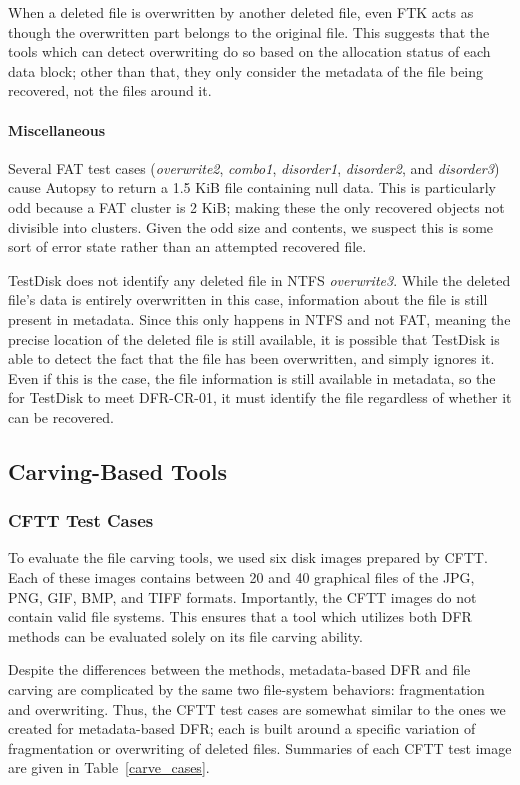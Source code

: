 When a deleted file is overwritten by another deleted file, even FTK acts as though the overwritten part belongs to the original file.
This suggests that the tools which can detect overwriting do so based on the allocation status of each data block; other than that, they only consider the metadata of the file being recovered, not the files around it.

\paragraph{Miscellaneous}
Several FAT test cases (\emph{overwrite2}, \emph{combo1}, \emph{disorder1}, \emph{disorder2}, and \emph{disorder3}) cause Autopsy to return a 1.5 KiB file containing null data.
This is particularly odd because a FAT cluster is 2 KiB; making these the only recovered objects not divisible into clusters.
Given the odd size and contents, we suspect this is some sort of error state rather than an attempted recovered file.

TestDisk does not identify any deleted file in NTFS \emph{overwrite3}.
While the deleted file's data is entirely overwritten in this case, information about the file is still present in metadata.
Since this only happens in NTFS and not FAT, meaning the precise location of the deleted file is still available, it is possible that TestDisk is able to detect the fact that the file has been overwritten, and simply ignores it.
Even if this is the case, the file information is still available in metadata, so the for TestDisk to meet DFR-CR-01, it must identify the file regardless of whether it can be recovered.


\subsection{Carving-Based Tools}

\subsubsection{CFTT Test Cases}
To evaluate the file carving tools, we used six disk images prepared by CFTT\cite{cftt_carving_images}.
Each of these images contains between 20 and 40 graphical files of the JPG, PNG, GIF, BMP, and TIFF formats.
Importantly, the CFTT images do not contain valid file systems.
This ensures that a tool which utilizes both DFR methods can be evaluated solely on its file carving ability.

Despite the differences between the methods, metadata-based DFR and file carving are complicated by the same two file-system behaviors: fragmentation and overwriting. Thus, the CFTT test cases are somewhat similar to the ones we created for metadata-based DFR; each is built around a specific variation of fragmentation or overwriting of deleted files.
Summaries of each CFTT test image are given in Table~\ref{carve_cases}.

